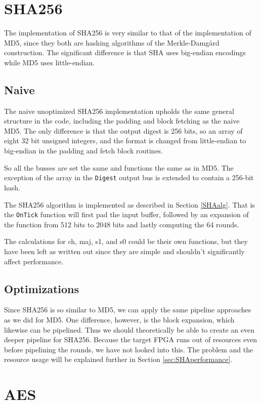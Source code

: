\documentclass[a4paper, openany]{book}
\begin{document}
\section{SHA256}
\label{sec:org6552da2}
The implementation of SHA256 is very similar to that of the implementation of MD5,
since they both are hashing algorithms of the Merkle-Damgård construction.
The significant difference is that SHA uses big-endian encodings while MD5 uses little-endian.

\subsection{Naive}
\label{SHAnaive}
The naive unoptimized SHA256 implementation upholds the same general structure in the code, including the padding and block fetching as the naive MD5.
The only difference is that the output digest is 256 bits, so an array of eight 32 bit unsigned integers,
and the format is changed from little-endian to big-endian in the padding and fetch block routines.

So all the busses are set the same and functions the same as in MD5. The exception of the array in the \texttt{Digest} output bus is extended to contain a 256-bit hash.

The SHA256 algorithm is implemented as described in Section \ref{SHAalg}. That is the \texttt{OnTick} function will first pad the input buffer, followed by an expansion of the function from 512 bits to 2048 bits and lastly computing the 64 rounds.

The calculations for ch, maj, s1, and s0 could be their own functions, but they have been left as written out since they are simple and shouldn't significantly affect performance.

\subsection{Optimizations}
\label{sec:orgbba97aa}
Since SHA256 is so similar to MD5, we can apply the same pipeline approaches as we did for MD5. One difference, however, is the block expansion, which likewise can be pipelined. Thus we should theoretically be able to create an even deeper pipeline for SHA256. Because the target FPGA runs out of resources even before pipelining the rounds, we have not looked into this. The problem and the resource usage will be explained further in Section \ref{sec:SHAperformance}.
\section{AES}
\label{sec:org9afa997}
\end{document}
